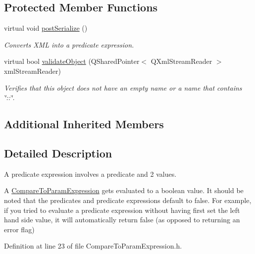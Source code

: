 \subsection*{Protected Member Functions}
\begin{DoxyCompactItemize}
\item 
virtual void \hyperlink{class_picto_1_1_compare_to_param_expression_af430076626bb0a5e6000a24cd4d48ab2}{post\-Serialize} ()
\begin{DoxyCompactList}\small\item\em Converts X\-M\-L into a predicate expression. \end{DoxyCompactList}\item 
\hypertarget{class_picto_1_1_compare_to_param_expression_a94c5b9ccf6c5ea02d33f84508934b20e}{virtual bool \hyperlink{class_picto_1_1_compare_to_param_expression_a94c5b9ccf6c5ea02d33f84508934b20e}{validate\-Object} (Q\-Shared\-Pointer$<$ Q\-Xml\-Stream\-Reader $>$ xml\-Stream\-Reader)}\label{class_picto_1_1_compare_to_param_expression_a94c5b9ccf6c5ea02d33f84508934b20e}

\begin{DoxyCompactList}\small\item\em Verifies that this object does not have an empty name or a name that contains \char`\"{}\-::\char`\"{}. \end{DoxyCompactList}\end{DoxyCompactItemize}
\subsection*{Additional Inherited Members}


\subsection{Detailed Description}
A predicate expression involves a predicate and 2 values. 

A \hyperlink{class_picto_1_1_compare_to_param_expression}{Compare\-To\-Param\-Expression} gets evaluated to a boolean value. It should be noted that the predicates and predicate expressions default to false. For example, if you tried to evaluate a predicate expression without having first set the left hand side value, it will automatically return false (as opposed to returning an error flag) 

Definition at line 23 of file Compare\-To\-Param\-Expression.\-h.



